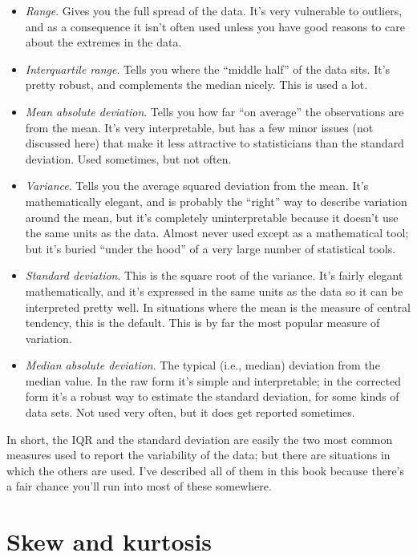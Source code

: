 \begin{itemize}
\item {\it Range}. Gives you the full spread of the data. It's very vulnerable to outliers, and as a consequence it isn't often used unless you have good reasons to care about the extremes in the data.
\item {\it Interquartile range}. Tells you where the ``middle half'' of the data sits. It's pretty robust, and complements the median nicely. This is used a lot.
\item {\it Mean absolute deviation}. Tells you how far ``on average'' the observations are from the mean. It's very interpretable, but has a few minor issues (not discussed here) that make it less attractive to statisticians than the standard deviation. Used sometimes, but not often.
\item {\it Variance}. Tells you the average squared deviation from the mean. It's mathematically elegant, and is probably the ``right'' way to describe variation around the mean, but it's completely uninterpretable because it doesn't use the same units as the data. Almost never used except as a mathematical tool; but it's buried ``under the hood'' of a very large number of statistical tools.
\item {\it Standard deviation}. This is the square root of the variance. It's fairly elegant mathematically, and it's expressed in the same units as the data so it can be interpreted pretty well. In situations where the mean is the measure of central tendency, this is the default. This is by far the most popular measure of variation. 
\item {\it Median absolute deviation}. The typical (i.e., median) deviation from the median value. In the raw form it's simple and interpretable; in the corrected form it's a robust way to estimate the standard deviation, for some kinds of data sets. Not used very often, but it does get reported sometimes.
\end{itemize}

\noindent
In short, the IQR and the standard deviation are easily the two most common measures used to report the variability of the data; but there are situations in which the others are used. I've described all of them in this book because there's a fair chance you'll run into most of these somewhere.

\section{Skew and kurtosis \label{sec:skew}\label{sec:kurtosis}}

